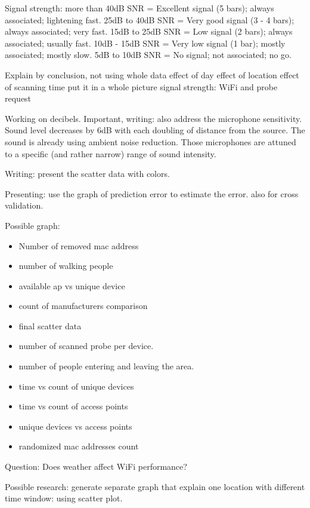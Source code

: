 Signal strength:
more than 40dB SNR = Excellent signal (5 bars); always associated; lightening fast.
25dB to 40dB SNR = Very good signal (3 - 4 bars); always associated; very fast.
15dB to 25dB SNR = Low signal (2 bars); always associated; usually fast.
10dB - 15dB SNR = Very low signal (1 bar); mostly associated; mostly slow.
5dB to 10dB SNR = No signal; not associated; no go.

Explain by conclusion, not using whole data
effect of day
effect of location
effect of scanning time
put it in a whole picture
signal strength: WiFi and probe request

Working on decibels.
Important, writing: also address the microphone sensitivity.
Sound level decreases by 6dB with each doubling of distance from the source.
The sound is already using ambient noise reduction.
Those microphones are attuned to a specific (and rather narrow) range of sound intensity.

Writing: present the scatter data with colors.

Presenting: use the graph of prediction error to estimate the error.
also for cross validation.

Possible graph:
\begin{itemize}
	\item Number of removed mac address
	\item number of walking people
	\item available ap vs unique device
	\item count of manufacturers comparison
	\item final scatter data
	\item number of scanned probe per device.
	\item number of people entering and leaving the area.
	\item time vs count of unique devices
	\item time vs count of access points
	\item unique devices vs access points
	\item randomized mac addresses count
\end{itemize}

Question: Does weather affect WiFi performance?

Possible research: generate separate graph that explain one location with different time window: using scatter plot.

